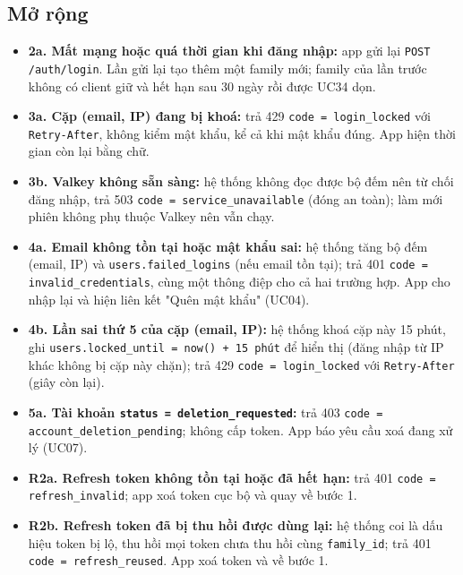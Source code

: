 \subsection{Mở rộng}
\begin{itemize}
\item \textbf{2a. Mất mạng hoặc quá thời gian khi đăng nhập:} app gửi lại {\small\texttt{POST /\allowbreak{}\allowbreak{}auth/\allowbreak{}\allowbreak{}login}}. Lần gửi lại tạo thêm một family mới; family của lần trước không có client giữ và hết hạn sau 30 ngày rồi được UC34 dọn.
\item \textbf{3a. Cặp (email, IP) đang bị khoá:} trả 429 {\small\texttt{code = login\_\allowbreak{}\allowbreak{}locked}} với {\small\texttt{Retry-\allowbreak{}After}}, không kiểm mật khẩu, kể cả khi mật khẩu đúng. App hiện thời gian còn lại bằng chữ.
\item \textbf{3b. Valkey không sẵn sàng:} hệ thống không đọc được bộ đếm nên từ chối đăng nhập, trả 503 {\small\texttt{code = service\_\allowbreak{}\allowbreak{}unavailable}} (đóng an toàn); làm mới phiên không phụ thuộc Valkey nên vẫn chạy.
\item \textbf{4a. Email không tồn tại hoặc mật khẩu sai:} hệ thống tăng bộ đếm (email, IP) và {\small\texttt{users.\allowbreak{}failed\_\allowbreak{}\allowbreak{}logins}} (nếu email tồn tại); trả 401 {\small\texttt{code = invalid\_\allowbreak{}\allowbreak{}credentials}}, cùng một thông điệp cho cả hai trường hợp. App cho nhập lại và hiện liên kết "Quên mật khẩu" (UC04).
\item \textbf{4b. Lần sai thứ 5 của cặp (email, IP):} hệ thống khoá cặp này 15 phút, ghi {\small\texttt{users.\allowbreak{}locked\_\allowbreak{}\allowbreak{}until = now() + 15 phút}} để hiển thị (đăng nhập từ IP khác không bị cặp này chặn); trả 429 {\small\texttt{code = login\_\allowbreak{}\allowbreak{}locked}} với {\small\texttt{Retry-\allowbreak{}After}} (giây còn lại).
\item \textbf{5a. Tài khoản {\small\texttt{status = deletion\_\allowbreak{}\allowbreak{}requested}}:} trả 403 {\small\texttt{code = account\_\allowbreak{}\allowbreak{}deletion\_\allowbreak{}\allowbreak{}pending}}; không cấp token. App báo yêu cầu xoá đang xử lý (UC07).
\item \textbf{R2a. Refresh token không tồn tại hoặc đã hết hạn:} trả 401 {\small\texttt{code = refresh\_\allowbreak{}\allowbreak{}invalid}}; app xoá token cục bộ và quay về bước 1.
\item \textbf{R2b. Refresh token đã bị thu hồi được dùng lại:} hệ thống coi là dấu hiệu token bị lộ, thu hồi mọi token chưa thu hồi cùng {\small\texttt{family\_\allowbreak{}\allowbreak{}id}}; trả 401 {\small\texttt{code = refresh\_\allowbreak{}\allowbreak{}reused}}. App xoá token và về bước 1.

\end{itemize}
